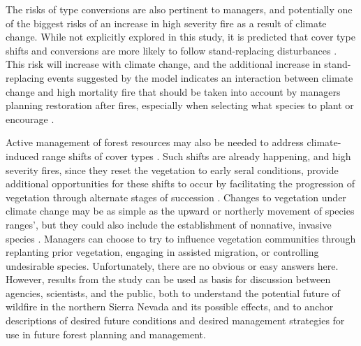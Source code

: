 The risks of type conversions are also pertinent to managers, and potentially one of the biggest risks of an increase in high severity fire as a result of climate change. While not explicitly explored in this study, it is predicted that cover type shifts and conversions are more likely to follow stand-replacing disturbances \citep{Stephens2013}. This risk will increase with climate change, and the additional increase in stand-replacing events suggested by the model indicates an interaction between climate change and high mortality fire that should be taken into account by managers planning restoration after fires, especially when selecting what species to plant or encourage \citep{Fule2008,Schwartz2015}. 

Active management of forest resources may also be needed to address climate-induced range shifts of cover types \citep{Keane2009}. Such shifts are already happening, and high severity fires, since they reset the vegetation to early seral conditions, provide additional opportunities for these shifts to occur by facilitating the progression of vegetation through alternate stages of succession \citep{Bachelet2001}. Changes to vegetation under climate change may be as simple as the upward or northerly movement of species ranges’, but they could also include the establishment of nonnative, invasive species \citep{McKenzie2004}. Managers can choose to try to influence vegetation communities through replanting prior vegetation, engaging in assisted migration, or controlling undesirable species. 
Unfortunately, there are no obvious or easy answers here. However, results from the study can be used as basis for discussion between agencies, scientists, and the public, both to understand the potential future of wildfire in the northern Sierra Nevada and its possible effects, and to anchor descriptions of desired future conditions and desired management strategies for use in future forest planning and management.



